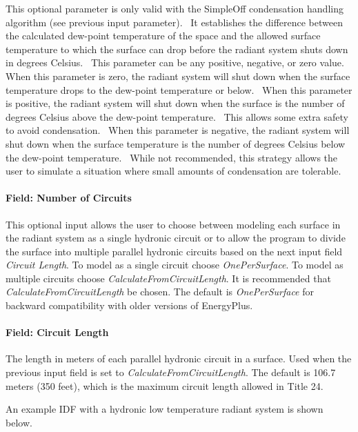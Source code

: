This optional parameter is only valid with the SimpleOff condensation handling algorithm (see previous input parameter).~ It establishes the difference between the calculated dew-point temperature of the space and the allowed surface temperature to which the surface can drop before the radiant system shuts down in degrees Celsius.~ This parameter can be any positive, negative, or zero value.~ When this parameter is zero, the radiant system will shut down when the surface temperature drops to the dew-point temperature or below.~ When this parameter is positive, the radiant system will shut down when the surface is the number of degrees Celsius above the dew-point temperature.~ This allows some extra safety to avoid condensation.~ When this parameter is negative, the radiant system will shut down when the surface temperature is the number of degrees Celsius below the dew-point temperature.~ While not recommended, this strategy allows the user to simulate a situation where small amounts of condensation are tolerable.

\paragraph{Field: Number of Circuits}\label{field-number-of-circuits}

This optional input allows the user to choose between modeling each surface in the radiant system as a single hydronic circuit or to allow the program to divide the surface into multiple parallel hydronic circuits based on the next input field \emph{Circuit Length}. To model as a single circuit choose \emph{OnePerSurface}. To model as multiple circuits choose \emph{CalculateFromCircuitLength}. It is recommended that \emph{CalculateFromCircuitLength} be chosen. The default is \emph{OnePerSurface} for backward compatibility with older versions of EnergyPlus.

\paragraph{Field: Circuit Length}\label{field-circuit-length}

The length in meters of each parallel hydronic circuit in a surface. Used when the previous input field is set to \emph{CalculateFromCircuitLength}. The default is 106.7 meters (350 feet), which is the maximum circuit length allowed in Title 24.

An example IDF with a hydronic low temperature radiant system is shown below.

